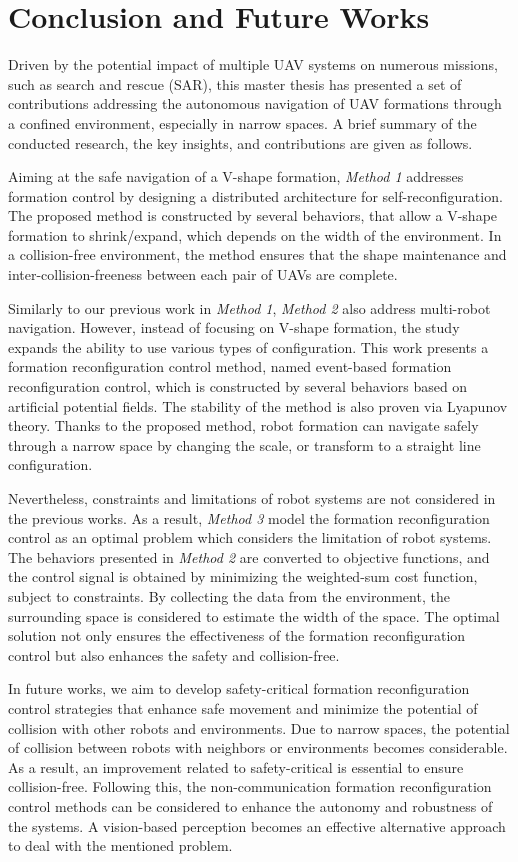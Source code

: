 \chapter{Conclusion and Future Works}\label{conclusion}

Driven by the potential impact of multiple UAV systems on numerous missions, such as search and rescue (SAR), this master thesis has presented a set of contributions addressing the autonomous navigation of UAV formations through a confined environment, especially in narrow spaces. A brief summary of the conducted research, the key insights, and contributions are given as follows.

Aiming at the safe navigation of a V-shape formation, \textit{Method 1} addresses formation control by designing a distributed architecture for self-reconfiguration. The proposed method is constructed by several behaviors, that allow a V-shape formation to shrink/expand, which depends on the width of the environment. In a collision-free environment, the method ensures that the shape maintenance and inter-collision-freeness between each pair of UAVs are complete. 

Similarly to our previous work in \textit{Method 1}, \textit{Method 2} also address multi-robot navigation. However, instead of focusing on V-shape formation, the study expands the ability to use various types of configuration. This work presents a formation reconfiguration control method, named event-based formation reconfiguration control, which is constructed by several behaviors based on artificial potential fields. The stability of the method is also proven via Lyapunov theory. Thanks to the proposed method, robot formation can navigate safely through a narrow space by changing the scale, or transform to a straight line configuration.

Nevertheless, constraints and limitations of robot systems are not considered in the previous works. As a result, \textit{Method 3} model the formation reconfiguration control as an optimal problem which considers the limitation of robot systems. The behaviors presented in \textit{Method 2} are converted to objective functions, and the control signal is obtained by minimizing the weighted-sum cost function, subject to constraints. By collecting the data from the environment, the surrounding space is considered to estimate the width of the space. The optimal solution not only ensures the effectiveness of the formation reconfiguration control but also enhances the safety and collision-free.

In future works, we aim to develop safety-critical formation reconfiguration control strategies that enhance safe movement and minimize the potential of collision with other robots and environments. Due to narrow spaces, the potential of collision between robots with neighbors or environments becomes considerable. As a result, an improvement related to safety-critical is essential to ensure collision-free. Following this, the non-communication formation reconfiguration control methods can be considered to enhance the autonomy and robustness of the systems. A vision-based perception becomes an effective alternative approach to deal with the mentioned problem.